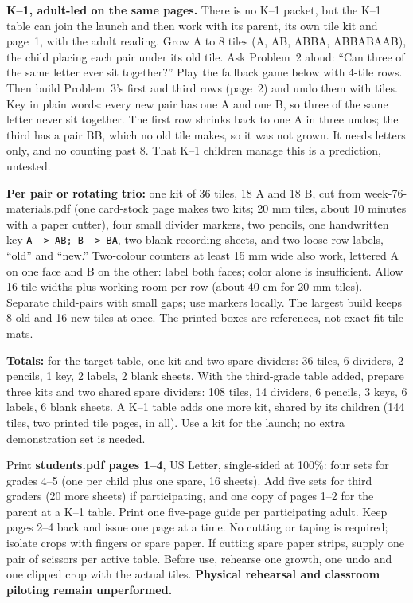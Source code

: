 \documentclass[11pt,letterpaper]{article}
\newcommand{\head}[1]{\par\vspace{5pt}{\large\bfseries #1}\par\nopagebreak\vspace{1pt}}
\newcommand{\word}[1]{\texttt{#1}}
\begin{document}
\textbf{K--1, adult-led on the same pages.} There is no K--1 packet, but the K--1 table can join the launch and then work with its parent, its own tile kit and page~1, with the adult reading. Grow A to 8 tiles (A, AB, ABBA, ABBABAAB), the child placing each pair under its old tile. Ask Problem~2 aloud: ``Can three of the same letter ever sit together?'' Play the fallback game below with 4-tile rows. Then build Problem~3's first and third rows (page~2) and undo them with tiles. Key in plain words: every new pair has one A and one B, so three of the same letter never sit together. The first row shrinks back to one A in three undos; the third has a pair BB, which no old tile makes, so it was not grown. It needs letters only, and no counting past 8. That K--1 children manage this is a prediction, untested.

\head{Prepare and print}
\textbf{Per pair or rotating trio:} one kit of 36 tiles, 18 A and 18 B, cut from week-76-materials.pdf (one card-stock page makes two kits; 20 mm tiles, about 10 minutes with a paper cutter), four small divider markers, two pencils, one handwritten key \word{A -> AB; B -> BA}, two blank recording sheets, and two loose row labels, ``old'' and ``new.'' Two-colour counters at least 15 mm wide also work, lettered A on one face and B on the other: label both faces; color alone is insufficient. Allow 16 tile-widths plus working room per row (about 40 cm for 20 mm tiles). Separate child-pairs with small gaps; use markers locally. The largest build keeps 8 old and 16 new tiles at once. The printed boxes are references, not exact-fit tile mats.

\textbf{Totals:} for the target table, one kit and two spare dividers: 36 tiles, 6 dividers, 2 pencils, 1 key, 2 labels, 2 blank sheets. With the third-grade table added, prepare three kits and two shared spare dividers: 108 tiles, 14 dividers, 6 pencils, 3 keys, 6 labels, 6 blank sheets. A K--1 table adds one more kit, shared by its children (144 tiles, two printed tile pages, in all). Use a kit for the launch; no extra demonstration set is needed.

Print \textbf{students.pdf pages 1--4}, US Letter, single-sided at 100\%: four sets for grades 4--5 (one per child plus one spare, 16 sheets). Add five sets for third graders (20 more sheets) if participating, and one copy of pages 1--2 for the parent at a K--1 table. Print one five-page guide per participating adult. Keep pages 2--4 back and issue one page at a time. No cutting or taping is required; isolate crops with fingers or spare paper. If cutting spare paper strips, supply one pair of scissors per active table. Before use, rehearse one growth, one undo and one clipped crop with the actual tiles. \textbf{Physical rehearsal and classroom piloting remain unperformed.}
\end{document}

